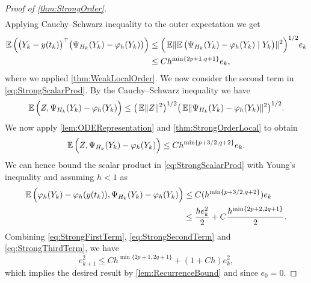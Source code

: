 \documentclass[10pt]{article}
\begin{document}
\begin{proof}[Proof of \cref{thm:StrongOrder}]
\begin{equation}
\begin{aligned}
	\end{aligned}
	\end{equation}
	Applying Cauchy--Schwarz inequality to the outer expectation we get
	\begin{equation}
	\begin{aligned}
		\operatorname{\mathbb{E}}\Big(\big(Y_k - y(t_k)\big)^\top \big(\Psi_{H_k}(Y_k) - \varphi_{h}(Y_k)\big)\Big) &\leq \Big(\operatorname{\mathbb{E}}\lVert\operatorname{\mathbb{E}}\big(\Psi_{H_k}(Y_k) - \varphi_{h}(Y_k) \mid Y_k\big)\rVert^{2}\Big)^{1/2}e_k  \\
		&\leq  Ch^{\min\{2p+1, q+1\}}e_k,
	\end{aligned}
	\end{equation}
	where we applied \cref{thm:WeakLocalOrder}. We now consider the second term in \eqref{eq:StrongScalarProd}. By the Cauchy--Schwarz inequality we have
	\begin{equation}
		\operatorname{\mathbb{E}}\Big(Z, \Psi_{H_k}(Y_k) - \varphi_{h}(Y_k)\Big) \leq \big(\operatorname{\mathbb{E}}\lVert Z\rVert^{2}\big)^{1/2} \big(\operatorname{\mathbb{E}}\lVert\Psi_{H_k}(Y_k) - \varphi_{h}(Y_k)\rVert^2\big)^{1/2}.
	\end{equation}
	We now apply \cref{lem:ODERepresentation} and \cref{thm:StrongOrderLocal} to obtain
	\begin{equation}
		\operatorname{\mathbb{E}}\Big(Z, \Psi_{H_k}(Y_k) - \varphi_{h}(Y_k)\Big) \leq C h^{\min\{p+3/2, q+2\}} e_k.
	\end{equation}
	We can hence bound the scalar product in \eqref{eq:StrongScalarProd} with Young's inequality and assuming $h < 1$ as
	\begin{equation}\label{eq:StrongThirdTerm}
	\begin{aligned}
		\operatorname{\mathbb{E}}\Big(\varphi_{h}(Y_k) - \varphi_{h}(y(t_k)), \Psi_{H_k}(Y_k) - \varphi_{h}(Y_k)\Big) &\leq C(h^{\min\{p+3/2, q+2\}})e_k \\
		&\leq \frac{he_k^2}{2} + C\frac{h^{\min\{2p+2,2q+1\}}}{2}.
	\end{aligned}
	\end{equation}
	Combining \eqref{eq:StrongFirstTerm}, \eqref{eq:StrongSecondTerm} and \eqref{eq:StrongThirdTerm}, we have
	\begin{equation}
		e_{k+1}^2 \leq Ch^{\min\{2p+1, 2q+1\}} + (1 + Ch)e_k^2,
	\end{equation}
	which implies the desired result by \cref{lem:RecurrenceBound} and since $e_0 = 0$.
\end{proof}
\end{document}
